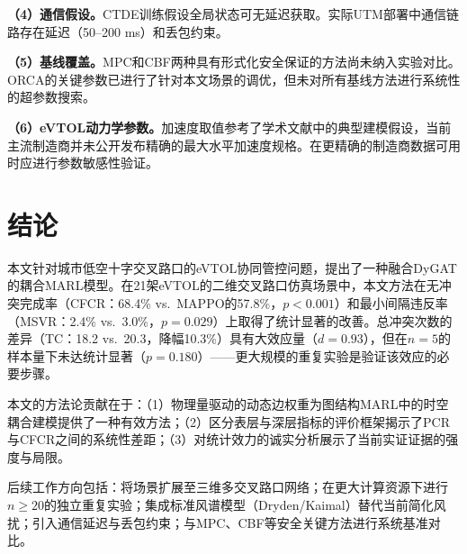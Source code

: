 \documentclass[12pt,a4paper,UTF8]{ctexart}
\begin{document}
\textbf{（4）通信假设。}CTDE训练假设全局状态可无延迟获取。实际UTM部署中通信链路存在延迟（50--200 ms）和丢包约束。

\textbf{（5）基线覆盖。}MPC和CBF两种具有形式化安全保证的方法尚未纳入实验对比。ORCA的关键参数已进行了针对本文场景的调优，但未对所有基线方法进行系统性的超参数搜索。

\textbf{（6）eVTOL动力学参数。}加速度取值参考了学术文献中的典型建模假设\cite{ref25}，当前主流制造商并未公开发布精确的最大水平加速度规格。在更精确的制造商数据可用时应进行参数敏感性验证。

\section{结论}

本文针对城市低空十字交叉路口的eVTOL协同管控问题，提出了一种融合DyGAT的耦合MARL模型。在21架eVTOL的二维交叉路口仿真场景中，本文方法在无冲突完成率（CFCR：68.4\% vs.\ MAPPO的57.8\%，$p<0.001$）和最小间隔违反率（MSVR：2.4\% vs.\ 3.0\%，$p=0.029$）上取得了统计显著的改善。总冲突次数的差异（TC：18.2 vs.\ 20.3，降幅10.3\%）具有大效应量（$d=0.93$），但在$n=5$的样本量下未达统计显著（$p=0.180$）——更大规模的重复实验是验证该效应的必要步骤。

本文的方法论贡献在于：（1）物理量驱动的动态边权重为图结构MARL中的时空耦合建模提供了一种有效方法；（2）区分表层与深层指标的评价框架揭示了PCR与CFCR之间的系统性差距；（3）对统计效力的诚实分析展示了当前实证证据的强度与局限。

后续工作方向包括：将场景扩展至三维多交叉路口网络；在更大计算资源下进行$n \geq 20$的独立重复实验；集成标准风谱模型（Dryden/Kaimal）替代当前简化风扰；引入通信延迟与丢包约束；与MPC、CBF等安全关键方法进行系统基准对比。
\end{document}
